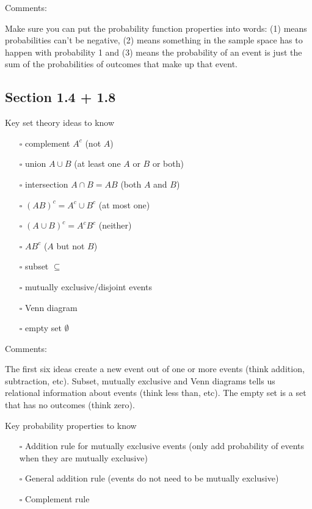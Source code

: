 \documentclass[
  letterpaper,
]{scrbook}
\providecommand{\tightlist}{%
  \setlength{\itemsep}{0pt}\setlength{\parskip}{0pt}}\usepackage{longtable,booktabs,array}
\begin{document}
Comments:

Make sure you can put the probability function properties into words:
(1) means probabilities can't be negative, (2) means something in the
sample space has to happen with probability 1 and (3) means the
probability of an event is just the sum of the probabilities of outcomes
that make up that event.

\subsection*{Section 1.4 + 1.8}\label{section-1.4-1.8}

Key set theory ideas to know

\begin{itemize}
\tightlist
\item[$\square$]
  complement \(A^c\) (not \(A\))
\item[$\square$]
  union \(A \cup B\) (at least one \(A\) or \(B\) or both)
\item[$\square$]
  intersection \(A \cap B = AB\) (both \(A\) and \(B\))
\item[$\square$]
  \((AB)^c = A^c \cup B^c\) (at most one)
\item[$\square$]
  \((A \cup B)^c = A^cB^c\) (neither)
\item[$\square$]
  \(AB^c\) (\(A\) but not \(B\))
\item[$\square$]
  subset \(\subseteq\)
\item[$\square$]
  mutually exclusive/disjoint events
\item[$\square$]
  Venn diagram
\item[$\square$]
  empty set \(\emptyset\)
\end{itemize}

Comments:

The first six ideas create a new event out of one or more events (think
addition, subtraction, etc). Subset, mutually exclusive and Venn
diagrams tells us relational information about events (think less than,
etc). The empty set is a set that has no outcomes (think zero).

Key probability properties to know

\begin{itemize}
\tightlist
\item[$\square$]
  Addition rule for mutually exclusive events (only add probability of
  events when they are mutually exclusive)
\item[$\square$]
  General addition rule (events do not need to be mutually exclusive)
\item[$\square$]
  Complement rule
\end{itemize}
\end{document}
